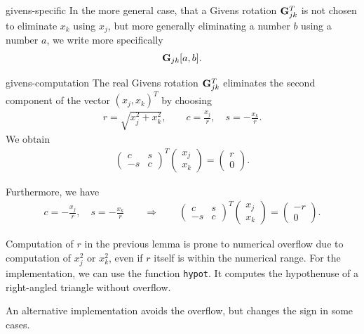 \begin{Notation}{givens-specific}
  In the more general case, that a Givens rotation $\mathbf G_{jk}^T$ is
  not chosen to eliminate $x_k$ using $x_j$, but more generally
  eliminating a number $b$ using a number $a$, we write more
  specifically
  \begin{gather}
    \mathbf G_{jk}[a,b].
  \end{gather}
\end{Notation}

\begin{Lemma}{givens-computation}
  The real Givens rotation $\mathbf G_{jk}^T$ eliminates the second
  component of the vector $(x_j,x_k)^T$ by choosing
  \begin{gather}
    r = \sqrt{x_j^2+x_k^2},\qquad
    c = \frac{x_j}r,\quad s = -\frac{x_k}r.
  \end{gather}
  We obtain
  \begin{gather}
    \begin{pmatrix}
      c & s \\ -s & c
    \end{pmatrix}^T
    \begin{pmatrix}
      x_j\\x_k
    \end{pmatrix}
    =
    \begin{pmatrix}
      r\\0
    \end{pmatrix}
    .
  \end{gather}
\end{Lemma}
\begin{todo}
  Furthermore, we have
  \begin{gather}
    c = -\frac{x_j}r,\quad s = -\frac{x_k}r
    \qquad \Rightarrow \qquad
    \begin{pmatrix}
      c & s \\ -s & c
    \end{pmatrix}^T
    \begin{pmatrix}
      x_j\\x_k
    \end{pmatrix}
    =
    \begin{pmatrix}
      -r\\0
    \end{pmatrix}
    .    
  \end{gather}    
\end{todo}

\begin{remark}
  Computation of $r$ in the previous lemma is prone to numerical
  overflow due to computation of $x_j^2$ or $x_k^2$, even if $r$
  itself is within the numerical range. For the implementation, we can
  use the function \lstinline!hypot!. It computes the hypothenuse of a
  right-angled triangle without overflow.

  An alternative implementation avoids the overflow, but changes the
  sign in some cases.
\end{remark}

